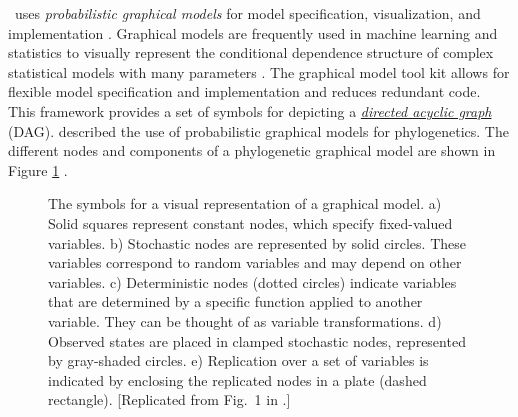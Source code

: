 \documentclass[11pt]{article}
\begin{document}
\RevBayes~uses \textit{probabilistic graphical models} for model specification, visualization, and implementation \citep{hoehnaGM2014}. 
Graphical models are frequently used in machine learning and statistics to visually represent the conditional dependence structure of complex statistical models with many parameters \citep{Gilks1994,lunn00,Jordan2004,Koller2009,Lunn2009}. 
The graphical model tool kit allows for flexible model specification and implementation and reduces redundant code. 
This framework provides a set of symbols for depicting a \href{http://en.wikipedia.org/wiki/Directed_acyclic_graph}{\textit{directed acyclic graph}} (DAG). 
\citet{hoehnaGM2014} described the use of probabilistic graphical models for phylogenetics. 
The different nodes and components of a phylogenetic graphical model are shown in Figure \ref{gmnotation} \citep[Fig. 1 from][]{hoehnaGM2014}. 
\begin{figure}[h!]
\centering
{}
\caption{\small The symbols for a visual representation of a graphical model. 
a) Solid squares represent constant nodes, which specify fixed-valued variables. 
b) Stochastic nodes are represented by solid circles. 
These variables correspond to random variables and may depend on other variables. 
c) Deterministic nodes (dotted circles) indicate variables that are determined by a specific function applied to another variable. 
They can be thought of as variable transformations. 
d) Observed states are placed in clamped stochastic nodes, represented by gray-shaded circles. e) Replication over a set of variables is indicated by enclosing the replicated nodes in a plate (dashed rectangle). 
[Replicated from Fig.~1 in \citet{hoehnaGM2014}.]
}
\label{gmnotation}
\end{figure}
\end{document}
